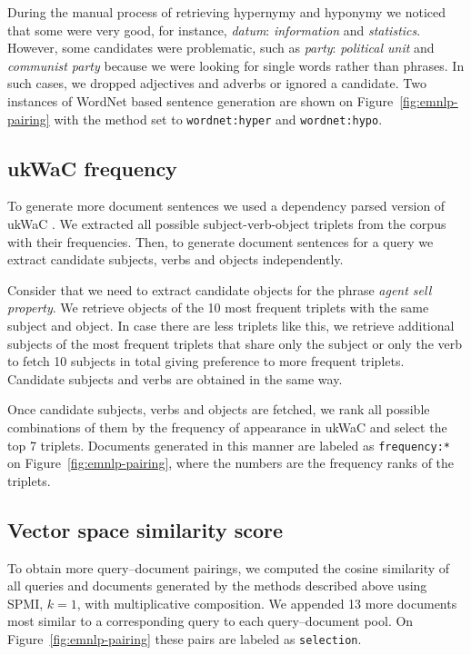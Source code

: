 During the manual process of retrieving hypernymy and hyponymy we noticed that some were very good, for instance, \textit{datum}: \textit{information} and \textit{statistics}. However, some candidates were problematic, such as \textit{party}: \textit{political unit} and \textit{communist party} because we were looking for single words rather than phrases. In such cases, we dropped adjectives and adverbs or ignored a candidate. Two instances of WordNet based sentence generation are shown on Figure~\ref{fig:emnlp-pairing} with the method set to \texttt{wordnet:hyper} and \texttt{wordnet:hypo}.

\subsection{ukWaC frequency}

To generate more document sentences we used a dependency parsed version of ukWaC \cite{ukwac}. We extracted all possible subject-verb-object triplets from the corpus with their frequencies. Then, to generate document sentences for a query we extract candidate subjects, verbs and objects independently.

Consider that we need to extract candidate objects for the phrase \textit{agent sell property}. We retrieve objects of the 10 most frequent triplets with the same subject and object. In case there are less triplets like this, we retrieve additional subjects of the most frequent triplets that share only the subject or only the verb to fetch 10 subjects in total giving preference to more frequent triplets. Candidate subjects and verbs are obtained in the same way.

Once candidate subjects, verbs and objects are fetched, we rank all possible combinations of them by the frequency of appearance in ukWaC and select the top 7 triplets. Documents generated in this manner are labeled as \texttt{frequency:*} on Figure~\ref{fig:emnlp-pairing}, where the numbers are the frequency ranks of the triplets.

\subsection{Vector space similarity score}

To obtain more query--document pairings, we computed the cosine similarity of all queries and documents generated by the methods described above using SPMI, $k=1$, with multiplicative composition. We appended 13 more documents most similar to a corresponding query to each query--document pool. On Figure~\ref{fig:emnlp-pairing} these pairs are labeled as \texttt{selection}.

